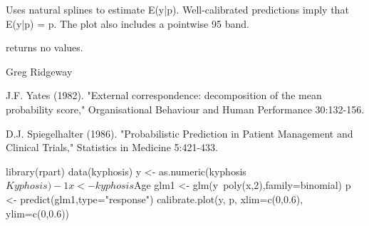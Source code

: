 \documentclass{article}
\begin{document}
\begin{Details}\relax
Uses natural splines to estimate E(y|p). Well-calibrated predictions
imply that E(y|p) = p. The plot also includes a pointwise 95
band.
\end{Details}
\begin{Value}
 returns no values.
\end{Value}
\begin{Author}\relax
Greg Ridgeway 
\end{Author}
\begin{References}\relax
J.F. Yates (1982). "External correspondence: decomposition of the mean
probability score," Organisational Behaviour and Human Performance 30:132-156.

D.J. Spiegelhalter (1986). "Probabilistic Prediction in Patient Management
and Clinical Trials," Statistics in Medicine 5:421-433.
\end{References}
\begin{Examples}
\begin{ExampleCode}
library(rpart)
data(kyphosis)
y <- as.numeric(kyphosis$Kyphosis)-1
x <- kyphosis$Age
glm1 <- glm(y~poly(x,2),family=binomial)
p <- predict(glm1,type="response")
calibrate.plot(y, p, xlim=c(0,0.6), ylim=c(0,0.6))
\end{ExampleCode}
\end{Examples}
\end{document}
